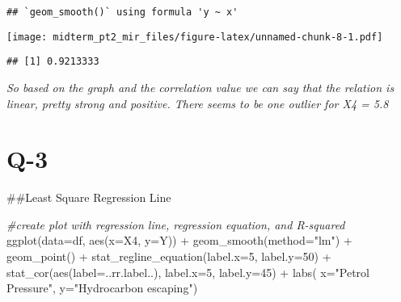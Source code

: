 \documentclass[
]{article}
\newenvironment{Shaded}{\begin{snugshade}}{\end{snugshade}}
\newcommand{\AttributeTok}[1]{\textcolor[rgb]{0.77,0.63,0.00}{#1}}
\newcommand{\CommentTok}[1]{\textcolor[rgb]{0.56,0.35,0.01}{\textit{#1}}}
\newcommand{\DecValTok}[1]{\textcolor[rgb]{0.00,0.00,0.81}{#1}}
\newcommand{\FunctionTok}[1]{\textcolor[rgb]{0.00,0.00,0.00}{#1}}
\newcommand{\NormalTok}[1]{#1}
\newcommand{\SpecialCharTok}[1]{\textcolor[rgb]{0.00,0.00,0.00}{#1}}
\newcommand{\StringTok}[1]{\textcolor[rgb]{0.31,0.60,0.02}{#1}}
\begin{document}
\begin{verbatim}
## `geom_smooth()` using formula 'y ~ x'
\end{verbatim}

\texttt{[image: midterm\_pt2\_mir\_files/figure-latex/unnamed-chunk-8-1.pdf]}

\begin{Shaded}
\end{Shaded}

\begin{verbatim}
## [1] 0.9213333
\end{verbatim}

\emph{So based on the graph and the correlation value we can say that
the relation is linear, pretty strong and positive. There seems to be
one outlier for X4 = 5.8}

\hypertarget{q-3}{%
\section{Q-3}\label{q-3}}

\#\#Least Square Regression Line

\begin{Shaded}
\begin{Highlighting}[]
\CommentTok{\#create plot with regression line, regression equation, and R{-}squared}
\FunctionTok{ggplot}\NormalTok{(}\AttributeTok{data=}\NormalTok{df, }\FunctionTok{aes}\NormalTok{(}\AttributeTok{x=}\NormalTok{X4, }\AttributeTok{y=}\NormalTok{Y)) }\SpecialCharTok{+}
        \FunctionTok{geom\_smooth}\NormalTok{(}\AttributeTok{method=}\StringTok{"lm"}\NormalTok{) }\SpecialCharTok{+}
        \FunctionTok{geom\_point}\NormalTok{() }\SpecialCharTok{+}
        \FunctionTok{stat\_regline\_equation}\NormalTok{(}\AttributeTok{label.x=}\DecValTok{5}\NormalTok{, }\AttributeTok{label.y=}\DecValTok{50}\NormalTok{) }\SpecialCharTok{+}
        \FunctionTok{stat\_cor}\NormalTok{(}\FunctionTok{aes}\NormalTok{(}\AttributeTok{label=}\NormalTok{..rr.label..), }\AttributeTok{label.x=}\DecValTok{5}\NormalTok{, }\AttributeTok{label.y=}\DecValTok{45}\NormalTok{) }\SpecialCharTok{+} \FunctionTok{labs}\NormalTok{( }\AttributeTok{x=}\StringTok{"Petrol Pressure"}\NormalTok{, }\AttributeTok{y=}\StringTok{"Hydrocarbon escaping"}\NormalTok{)}
\end{Highlighting}
\end{Shaded}
\end{document}
